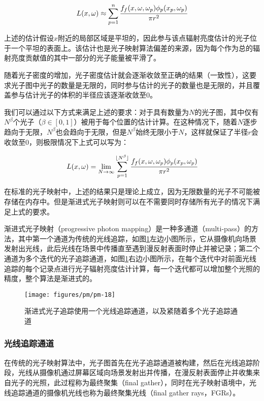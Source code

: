 \begin{equation}
	L(x,{\omega})\approx \sum^{n}_{p=1} \cfrac{f_f(x,{\omega},{\omega}_p)\phi_p(x_p,{\omega}_p)}{\pi r^{2}}
\end{equation}

上述的估计假设$x$附近的局部区域是平坦的，因此参与该点辐射亮度估计的光子位于一个平坦的表面上。该估计也是光子映射算法偏差的来源，因为每个作为总的辐射亮度贡献值的其中一部分的光子能量被平滑了。

随着光子密度的增加，光子密度估计就会逐渐收敛至正确的结果（一致性），这要求光子图中光子的数量是无限的，同时参与估计的光子的数量也是无限的，并且覆盖参与估计光子的体积的半径应该逐渐收敛至0。

我们可以通过以下方式来满足上述的要求：对于具有数量为$N$的光子图，其中仅有$N^{\beta}$个光子（$\beta\in[0,1]$）被用于每个位置的估计计算。在这种情况下，随着$N$逐步趋向于无限，$N^{\beta}$也会趋向于无限，但是$N^{\beta}$始终无限小于$N$，这样就保证了半径$r$会收敛至0，则极限情况下上式可以写为\cite{b:RealisticImageSynthesisUsingPhotonMapping}：

\begin{equation}\label{e:pm-consistent-equation}
	L(x,{\omega})=\lim_{N\to\infty} \sum^{\lfloor N^{\beta} \rfloor}_{p=1} \cfrac{f_f(x,{\omega},{\omega}_p)\phi_p(x_p,{\omega}_p)}{\pi r^{2}}
\end{equation}

在标准的光子映射中，上述的结果只是理论上成立，因为无限数量的光子不可能被存储在内存中。但是渐进式光子映射则可以在不需要同时存储所有光子的情况下满足上式的要求。

渐进式光子映射（progressive photon mapping）是一种多通道（multi-pass）的方法，其中第一个通道为传统的光线追踪，如图\ref{f:pm-progressive-photon-mapping}左边小图所示，它从摄像机向场景发射出光线，此后光线在场景中传播直至遇到漫反射表面时停止并被记录；第二个通道为多个迭代的光子追踪通道，如图\ref{f:pm-progressive-photon-mapping}右边小图所示，在每个迭代中对前面光线追踪的每个记录点进行光子辐射亮度估计计算，每一个迭代都可以增加整个光照的精度，整个算法是渐进式的。

\begin{figure}
	\texttt{[image: figures/pm/pm-18]}
	\caption{渐进式光子追踪使用一个光线追踪通道，以及紧随着多个光子追踪通道}
	\label{f:pm-progressive-photon-mapping}
\end{figure}




\subsubsection{光线追踪通道}
在传统的光子映射算法中，光子图首先在光子追踪通道被构建，然后在光线追踪阶段，光线从摄像机通过屏幕区域向场景发射出并传播，在漫反射表面停止并收集来自光子的光照，此过程称为最终聚集（final gather），同时在光子映射语境中，光线追踪通道的摄像机光线也称为最终聚集光线（final gather rays，FGRs）。

